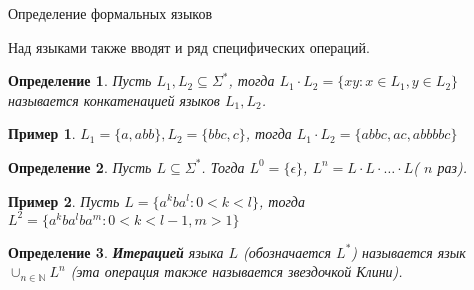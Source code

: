 \documentclass[12pt, pdf, hyperref={unicode},handout]{beamer}
\newtheorem{dfn}{Определение}
\newtheorem{exmpl}{Пример}
\begin{document}
\begin{frame}{Определение формальных языков}
  \begin{block}

    \small{
      Над языками также вводят и ряд специфических операций.
\begin{dfn}
        Пусть $L_1, L_2\subseteq \Sigma^*$, тогда $L_1\cdot L_2=\{xy:x\in L_1, y\in L_2\}$ называется конкатенацией языков $L_1,L_2$.
      \end{dfn}
      \begin{exmpl}
        $L_1=\{a,abb\}, L_2=\{bbc,c\}$, тогда $L_1\cdot L_2=\{abbc, ac, abbbbc\}$
      \end{exmpl}
      \begin{dfn}
        Пусть $L\subseteq \Sigma^*$. Тогда $L^0=\{\epsilon\}$, $L^n=L\cdot L\cdot\ldots \cdot L $( $n$ раз).
      \end{dfn}
      \begin{exmpl}
        Пусть $L=\{a^kba^l:0<k<l\}$, тогда $L^2=\{a^kba^lba^m:0<k<l-1,m>1\}$
      \end{exmpl}
      \begin{dfn}
        \textbf{Итерацией} языка $L$ (обозначается $L^*$) называется язык $\cup_{n\in\mathbb{N}}L^n$ (эта операция также называется звездочкой Клини).
      \end{dfn}
      }

  \end{block}
  
\end{frame}
\end{document}
